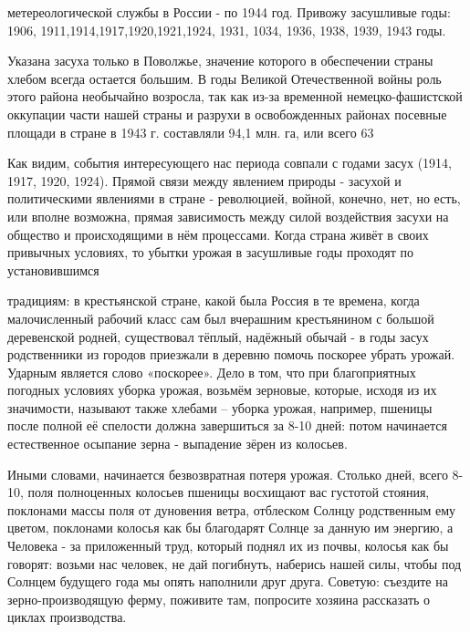 \label{076-1}
метереологической службы в России - по 1944 год. Привожу засушливые годы:
1906, 1911,1914,1917,1920,1921,1924, 1931, 1034, 1936, 1938, 1939, 1943 годы.

\label{076-2}
 Указана засуха только в Поволжье, значение которого в обеспечении страны хлебом всегда остается большим. В годы Великой Отечественной войны роль этого района необычайно возросла, так как из-за временной немецко-фашистской оккупации части нашей страны и разрухи в освобожденных районах посевные площади в стране в 1943 г. составляли 94,1 млн. га, или всего 63%

\label{076-3}
Как видим, события интересующего нас периода совпали с годами засух (1914, 1917, 1920, 1924). Прямой связи между явлением природы - засухой и политическими явлениями в стране - революцией, войной, конечно, нет, но есть, или вполне возможна, прямая зависимость между силой воздействия засухи на общество и происходящими в нём процессами. Когда страна живёт в своих привычных условиях, то убытки урожая в засушливые годы проходят по установившимся

\label{077-1}
традициям: в крестьянской стране, какой была Россия в те времена, когда малочисленный рабочий класс сам был вчерашним крестьянином с большой деревенской родней, существовал тёплый, надёжный обычай - в годы засух родственники из городов приезжали в деревню помочь поскорее убрать урожай. Ударным является слово «поскорее». Дело в том, что при благоприятных погодных условиях уборка урожая, возьмём зерновые, которые, исходя из их значимости, называют также хлебами – уборка урожая, например, пшеницы после полной её спелости должна завершиться за 8-10 дней: потом начинается естественное осыпание зерна - выпадение зёрен из колосьев.

\label{078-1}
Иными словами, начинается безвозвратная потеря урожая. Столько дней, всего 8-10, поля полноценных колосьев пшеницы восхищают вас густотой стояния, поклонами массы поля от дуновения ветра, отблеском Солнцу родственным ему цветом, поклонами колосья как бы благодарят Солнце за данную им энергию, а Человека - за приложенный труд, который поднял их из почвы, колосья как бы говорят: возьми нас человек, не дай погибнуть, наберись нашей силы, чтобы под Солнцем будущего года мы опять наполнили друг друга. Советую: съездите на зерно-производящую ферму, поживите там, попросите хозяина рассказать о циклах производства.


